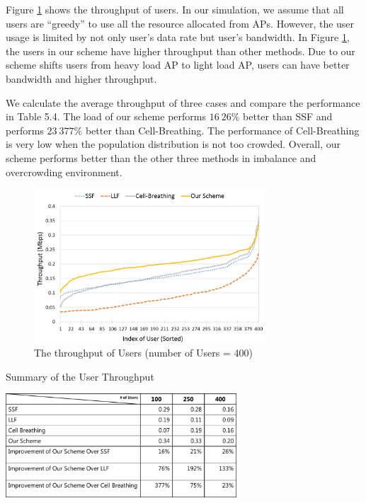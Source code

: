Figure \ref{fig:Average-user-throughput} shows the throughput of users. In our simulation, we assume that all users are “greedy” to use all the resource allocated from APs. However, the user usage is limited by not only user’s data rate but user’s bandwidth. In Figure \ref{fig:Average-user-throughput}, the users in our scheme have higher throughput than other methods. Due to our scheme shifts users from heavy load AP to light load AP, users can have better bandwidth and higher throughput.

We calculate the average throughput of three cases and compare the performance in Table 5.4. The load of our scheme performs $16~26\%$ better than SSF and performs $23~377\%$ better than Cell-Breathing. The performance of Cell-Breathing is very low when the population distribution is not too crowded. Overall, our scheme performs better than the other three methods in imbalance and overcrowding environment.

\begin{figure}[tbp]
\begin{center}
\includegraphics[width=3.4in]{images/Average_user_throughput.png}
\end{center}
\caption{The throughput of Users (number of Users = 400)}
\label{fig:Average-user-throughput}
\end{figure}

\begin{table}[tbp]
\setlength{\belowcaptionskip}{15pt}
\centering
\caption{Summary of the User Throughput}
\label{tab:Simulation-Setup}
\includegraphics[width=3.4in]{images/table4_4.png}
\end{table}

